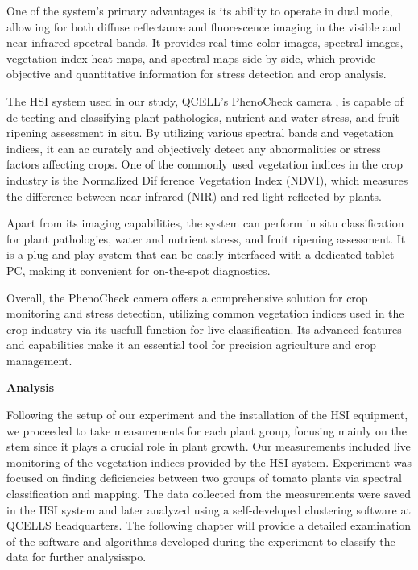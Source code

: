 \documentclass{article}
\begin{document}
{\begin{enumerate}
                            \end{enumerate}
                        One of the system’s primary advantages is its ability to operate in dual mode, allowing for both diffuse reflectance and fluorescence imaging in the visible and near-infrared spectral bands. It provides real-time color images, spectral images, vegetation index heat maps, and spectral maps side-by-side, which provide objective and quantitative information for stress detection and crop analysis.\par
                        The HSI system used in our study, QCELL’s PhenoCheck camera , is capable of detecting and classifying plant pathologies, nutrient and water stress, and fruit ripening assessment in situ. By utilizing various spectral bands and vegetation indices, it can accurately and objectively detect any abnormalities or stress factors affecting crops. One of the commonly used vegetation indices in the crop industry is the Normalized Difference Vegetation Index (NDVI), which measures the difference between near-infrared (NIR) and red light reflected by plants.\par
                        Apart from its imaging capabilities, the system can perform in situ classification for plant pathologies, water and nutrient stress, and fruit ripening assessment. It is a plug-and-play system that can be easily interfaced with a dedicated tablet PC, making it convenient for on-the-spot diagnostics.\par
                        Overall, the PhenoCheck camera offers a comprehensive solution for crop monitoring and stress detection, utilizing common vegetation indices used in the crop industry via its usefull function for live classification. Its advanced features and capabilities make it an essential tool for precision agriculture and crop management.
                    \vspace*{1\baselineskip}
                    
                    \textbf{Analysis}
                    \vspace*{1\baselineskip}
                    
                        \hspace{0.5cm}Following the setup of our experiment and the installation of the HSI equipment, we proceeded to take measurements for each plant group, focusing mainly on the stem since it plays a crucial role in plant growth. Our measurements included live monitoring of the vegetation indices provided by the HSI system. Experiment was focused on finding deficiencies between two groups of tomato plants via spectral classification and mapping. The data collected from the measurements were saved in the HSI system and later analyzed using a self-developed clustering software at QCELLS headquarters. The following chapter will provide a detailed examination of the software and algorithms developed during the experiment to classify the data for further analysisspo.
                        
}
\end{document}
